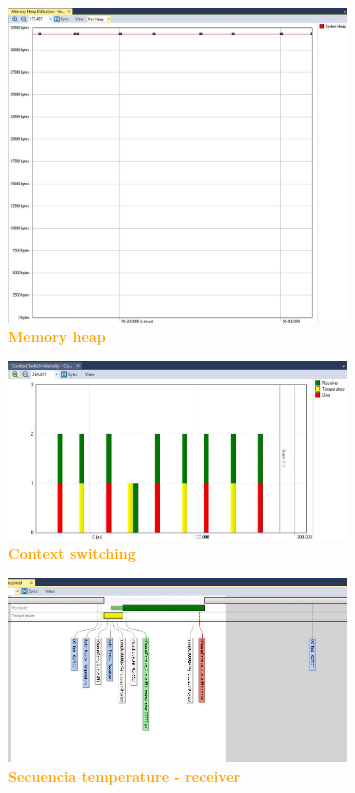\documentclass{article}
\begin{document}
\begin{figure}[H]
   \centering
   \includegraphics[width=0.8\textwidth]{figures/trace10.jpg}
   \centering
   \caption{\textbf{\textcolor{Orange}{Memory heap}}}
\end{figure}

\begin{figure}[H]
   \centering
   \includegraphics[width=0.8\textwidth]{figures/trace11.jpg}
   \centering
   \caption{\textbf{\textcolor{Orange}{Context switching}}}
\end{figure}

\begin{figure}[H]
   \centering
   \includegraphics[width=0.8\textwidth]{figures/trace13.jpg}
   \centering
   \caption{\textbf{\textcolor{Orange}{Secuencia temperature - receiver}}}
\end{figure}
\end{document}
